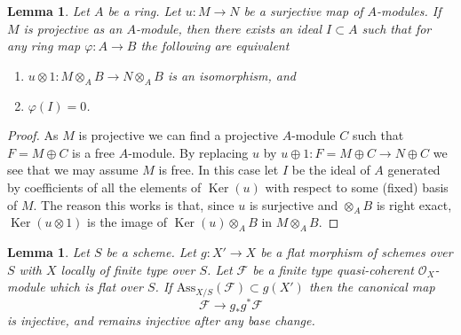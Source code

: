 \documentclass{amsart}
\theoremstyle{plain}
\newtheorem{lemma}[subsection]{Lemma}
\theoremstyle{definition}
\theoremstyle{remark}
\numberwithin{equation}{subsection}
\def\Ker{\mathop{\mathrm{Ker}}}
\begin{document}
\begin{lemma}
\label{lemma-flattening-module-map}
Let $A$ be a ring. Let $u : M \to N$ be a surjective map of $A$-modules.
If $M$ is projective as an $A$-module, then there exists an ideal
$I \subset A$ such that for any ring map $\varphi : A \to B$
the following are equivalent
\begin{enumerate}
\item $u \otimes 1 : M \otimes_A B \to N \otimes_A B$ is an
isomorphism, and
\item $\varphi(I) = 0$.
\end{enumerate}
\end{lemma}

\begin{proof}
As $M$ is projective we can find a projective $A$-module $C$
such that $F = M \oplus C$ is a free $A$-module.
By replacing $u$ by $u \oplus 1 : F = M \oplus C \to N \oplus C$
we see that we may assume $M$ is free. In this case let $I$ be
the ideal of $A$ generated by coefficients of all the elements of
$\Ker(u)$ with respect to some (fixed) basis of $M$.
The reason this works is that, since $u$ is surjective and
$\otimes_A B$ is right exact, $\Ker(u \otimes 1)$ is
the image of $\Ker(u) \otimes_A B$ in $M \otimes_A B$.
\end{proof}


\begin{lemma}
\label{lemma-universally-separating}
Let $S$ be a scheme.
Let $g : X' \to X$ be a flat morphism of schemes over $S$
with $X$ locally of finite type over $S$.
Let $\mathcal{F}$ be a finite type quasi-coherent $\mathcal{O}_X$-module
which is flat over $S$. If $\text{Ass}_{X/S}(\mathcal{F}) \subset g(X')$
then the canonical map
$$
\mathcal{F} \longrightarrow g_*g^*\mathcal{F}
$$
is injective, and remains injective after any base change.
\end{lemma}
\end{document}
